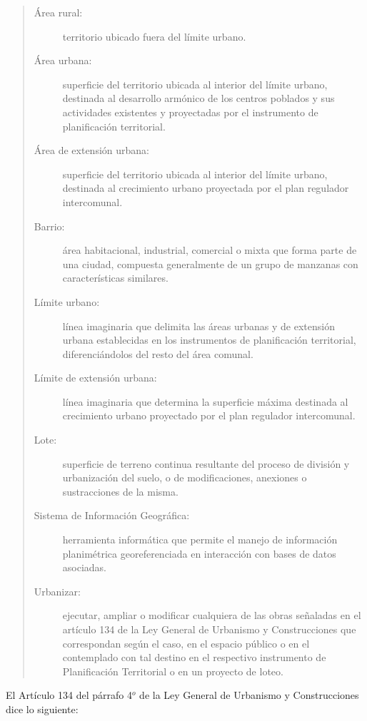 \begin{quote}
\begin{description}
  \item[Área rural:] territorio ubicado fuera del límite urbano.
  \item[Área urbana:] superficie del territorio ubicada al interior del límite urbano, destinada al
  desarrollo armónico de los centros poblados y sus actividades existentes y proyectadas por el
  instrumento de planificación territorial.
  \item[Área de extensión urbana:] superficie del territorio ubicada al interior del límite urbano,
  destinada al crecimiento urbano proyectada por el plan regulador intercomunal.
  \item[Barrio:] área habitacional, industrial, comercial o mixta que forma parte de una ciudad,
  compuesta generalmente de un grupo de manzanas con características similares.
  \item[Límite urbano:] línea imaginaria que delimita las áreas urbanas y de extensión urbana
  establecidas en los instrumentos de planificación territorial, diferenciándolos del resto del área
  comunal.
  \item[Límite de extensión urbana:] línea imaginaria que determina la superficie máxima destinada al
  crecimiento urbano proyectado por el plan regulador intercomunal.
  \item[Lote:] superficie de terreno continua resultante del proceso de división y urbanización del
  suelo, o de modificaciones, anexiones o sustracciones de la misma.
  \item[Sistema de Información Geográfica:] herramienta informática que permite el manejo de
  información planimétrica georeferenciada en interacción con bases de datos asociadas.
  \item[Urbanizar:] ejecutar, ampliar o modificar cualquiera de las obras señaladas en el artículo
  134 de la Ley General de Urbanismo y Construcciones que correspondan según el caso, en el espacio
  público o en el contemplado con tal destino en el respectivo instrumento de Planificación
  Territorial o en un proyecto de loteo.
\end{description}
\end{quote}

El Artículo 134 del párrafo 4$^{o}$ de la Ley General de Urbanismo y Construcciones dice lo
siguiente:

